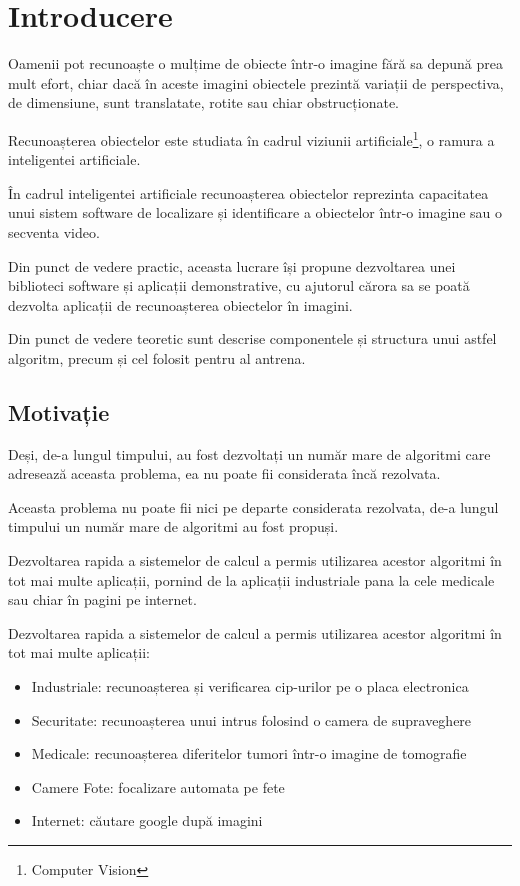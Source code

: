 \chapter{Introducere}

Oamenii pot recunoaște o mulțime de obiecte într-o imagine fără sa depună prea mult efort, chiar dacă în aceste imagini obiectele prezintă variații de perspectiva, de dimensiune, sunt translatate, rotite sau chiar obstrucționate.

Recunoașterea obiectelor este studiata în cadrul viziunii artificiale\footnote{Computer Vision}, o ramura a inteligentei artificiale.

În cadrul inteligentei artificiale recunoașterea obiectelor reprezinta capacitatea unui sistem software de localizare și identificare a obiectelor într-o imagine sau o secventa video.

Din punct de vedere practic, aceasta lucrare își propune dezvoltarea unei biblioteci software și aplicații demonstrative, cu ajutorul cărora sa se poată dezvolta aplicații de recunoașterea obiectelor în imagini.

Din punct de vedere teoretic sunt descrise componentele și structura unui astfel algoritm, precum și cel folosit pentru al antrena.


\section{Motivație}


Deși, de-a lungul timpului, au fost dezvoltați un număr mare de algoritmi care adresează aceasta problema, ea nu poate fii considerata încă rezolvata.



Aceasta problema nu poate fii nici pe departe considerata rezolvata, de-a lungul timpului un număr mare de algoritmi au fost propuși.

Dezvoltarea rapida a sistemelor de calcul a permis utilizarea acestor algoritmi în tot mai multe aplicații, pornind de la aplicații industriale pana la cele medicale sau chiar în pagini pe internet.

Dezvoltarea rapida a sistemelor de calcul a permis utilizarea acestor algoritmi în tot mai multe aplicații:
\begin{itemize}
	\item Industriale: recunoașterea și verificarea cip-urilor pe o placa electronica
	\item Securitate: recunoașterea unui intrus folosind o camera de supraveghere
	\item Medicale: recunoașterea diferitelor tumori într-o imagine de tomografie
	\item Camere Fote: focalizare automata pe fete
	\item Internet: căutare google după imagini
\end{itemize}



